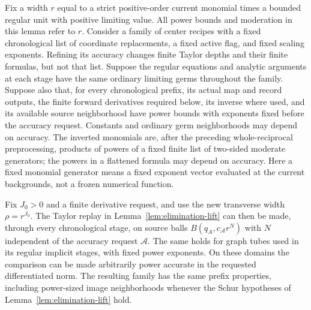 \begin{lemma}
\label{lem:elimination-common-domain}
Fix a width $r$ equal to a strict positive-order current monomial
times a bounded regular unit with positive limiting value.
All power bounds and moderation in this lemma refer to $r$.
Consider a family of center recipes with a fixed chronological list
of coordinate replacements, a fixed active flag, and fixed scaling
exponents.  Refining its accuracy changes finite Taylor depths and
their finite formulas, but not that list.  Suppose the regular
equations and analytic arguments at each stage have the same
ordinary limiting germs throughout the family.  Suppose also that,
for every chronological prefix, its actual map and record outputs,
the finite forward derivatives required below, its inverse where
used, and its available source neighborhood have power bounds with
exponents fixed before the accuracy request.  Constants and ordinary
germ neighborhoods may depend on accuracy.  The inverted monomials
are, after the preceding whole-reciprocal preprocessing, products of
powers of a fixed finite list of two-sided moderate generators;
the powers in a flattened formula may depend on accuracy.  Here a
fixed monomial generator means a fixed exponent vector evaluated at
the current backgrounds, not a frozen numerical function.

Fix $J_0>0$ and a finite derivative request, and use the new
transverse width $\rho=r^{J_0}$.  The Taylor replay in
Lemma~\ref{lem:elimination-lift} can then be made,
through every chronological stage, on source balls
$B(q_A,c_{\mathcal A} r^N)$ with $N$ independent of the accuracy request $\mathcal A$.
The same holds for graph tubes used in its regular implicit stages,
with fixed power exponents.  On these domains the comparison can be
made arbitrarily power accurate in the requested differentiated norm.
The resulting family has the same prefix properties, including
power-sized image neighborhoods whenever the Schur hypotheses of
Lemma~\ref{lem:elimination-lift} hold.
\end{lemma}


